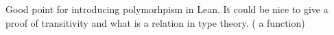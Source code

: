 Good point for introducing polymorhpism in Lean.
It could be nice to give a proof of transitivity and what is a relation in type theory. ( a function)









